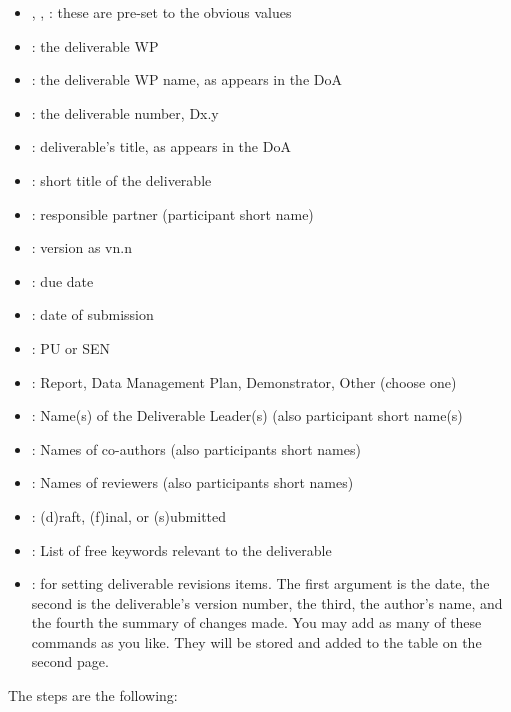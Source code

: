 \begin{itemize}
    \item {}, , : these are pre-set to the obvious values
    \item {}: the deliverable WP
    \item {}: the deliverable WP name, as appears in the DoA
    \item {}: the deliverable number, Dx.y
    \item {}: deliverable's title, as appears in the DoA
    \item {}: short title of the deliverable
    \item {}: responsible partner (participant short name)
    \item {}: version as vn.n
    \item {}: due date
    \item {}: date of submission
    \item {}: PU or SEN
    \item {}: Report, Data Management Plan, Demonstrator, Other (choose one)
    \item {}: Name(s) of the Deliverable Leader(s) (also participant short name(s)
    \item {}: Names of co-authors (also participants short names)
    \item {}: Names of reviewers (also participants short names)
    \item {}: (d)raft, (f)inal, or (s)ubmitted
    \item {}: List of free keywords relevant to the deliverable
    \item {}: for setting deliverable revisions items. The first argument is the date, the second is the deliverable's version number, the third, the author's name, and the fourth the summary of changes made. You may add as many of these commands as you like. They will be stored and added to the table on   the second page.  
\end{itemize}

The steps are the following: 

